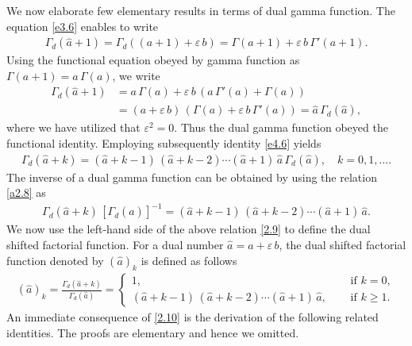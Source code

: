 \documentclass[11pt,a4paper,fleqn]{article}
\numberwithin{equation}{section}
\numberwithin{lemma}{section}
\numberwithin{theorem}{section}
\numberwithin{corollary}{section}
\begin{document}
We now elaborate few elementary results in terms of dual gamma function. The equation \eqref{e3.6} enables to write 
\begin{align}
	\Gamma_d (\widehat{a} + 1) = \Gamma_d ((a + 1) + \varepsilon \, b) =   \Gamma (a + 1) +   \varepsilon \, b  \, \Gamma' (a + 1).\label{e4.6}
\end{align}
Using the functional equation obeyed by gamma function as $\Gamma (a + 1) = a \, \Gamma (a)$, we write
\begin{align}
	\Gamma_d (\widehat{a} + 1)  & =   a \, \Gamma (a) +   \varepsilon \, b  \, (a \, \Gamma' (a) + \Gamma (a))\nonumber\\
	& = (a + \varepsilon \, b) \, (\Gamma (a) + \varepsilon \, b \, \Gamma'(a)) = \widehat{a} \, 	\Gamma_d (\widehat{a}),\label{2.8}
\end{align}
where we have utilized that $\varepsilon^2 = 0$. Thus the dual gamma function obeyed the functional identity. Employing subsequently identity  \eqref{e4.6} yields
\begin{align}
	\Gamma_d (\widehat{a} + k)   = (\widehat{a} + k - 1) \, (\widehat{a} + k - 2) \cdots (\widehat{a} + 1)  \, \widehat{a} \, 	\Gamma_d (\widehat{a}), \quad k = 0, 1, \dots.\label{a2.8}
\end{align}
The inverse of a dual gamma function can be obtained by using the relation \eqref{a2.8} as
\begin{align}
	\Gamma_d (\widehat{a} + k)  \, [\Gamma_d (\widehat{a})]^{-1} = (\widehat{a} + k - 1) \, (\widehat{a} + k - 2) \cdots (\widehat{a} + 1)  \, \widehat{a}.\label{2.9}
\end{align}
We now use the left-hand side of the above relation \eqref{2.9} to define the dual shifted factorial function. For a dual number $\widehat{a} = a + \varepsilon \, b$, the dual shifted factorial function denoted by $(\widehat{a})_k$ is defined as follows
\begin{align}
	(\widehat{a})_k = \frac{\Gamma_d (\widehat{a} + k)}{\Gamma_d (\widehat{a})} = \begin{cases}
		1, \quad & \text{ if } k = 0,\\
		(\widehat{a} + k - 1) \, (\widehat{a} + k - 2) \cdots (\widehat{a} + 1)  \, \widehat{a}, \quad & \text{ if } k \ge 1. \label{2.10}
	\end{cases}
\end{align}
An immediate consequence of \eqref{2.10} is the derivation of the following related identities. The proofs are elementary and hence we omitted. 
\end{document}
